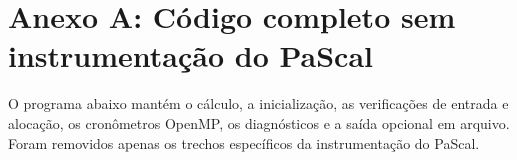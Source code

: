 \documentclass[11pt,letterpaper]{article}
\begin{document}
\appendix
\clearpage
\section*{Anexo A: Código completo sem instrumentação do PaScal}
O programa abaixo mantém o cálculo, a inicialização, as verificações de entrada e alocação, os cronômetros OpenMP, os diagnósticos e a saída opcional em arquivo. Foram removidos apenas os trechos específicos da instrumentação do PaScal.


\end{document}
